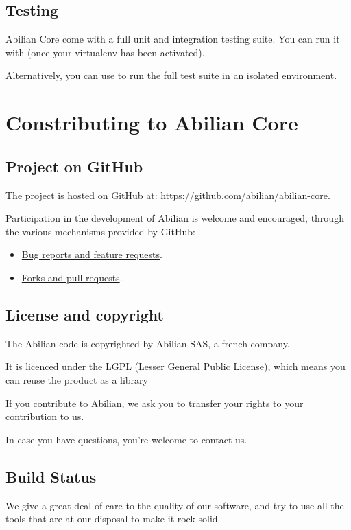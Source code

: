 \documentclass[a4paper,12pt,english]{sphinxmanual}
\begin{document}
\section{Testing}
\label{installing:testing}
Abilian Core come with a full unit and integration testing suite. You
can run it with  (once your virtualenv has been activated).

Alternatively, you can use  to run the full test suite in an
isolated environment.


\chapter{Constributing to Abilian Core}
\label{contributing:constributing-to-abilian-core}\label{contributing::doc}

\section{Project on GitHub}
\label{contributing:project-on-github}
The project is hosted on GitHub at: \href{https://github.com/abilian/abilian-core}{https://github.com/abilian/abilian-core}.

Participation in the development of Abilian is welcome and encouraged, through
the various mechanisms provided by GitHub:
\begin{itemize}
\item {} 
\href{https://github.com/abilian/abilian-core/issues}{Bug reports and feature requests}.

\item {} 
\href{https://github.com/abilian/abilian-core/pulls}{Forks and pull requests}.

\end{itemize}


\section{License and copyright}
\label{contributing:license-and-copyright}
The Abilian code is copyrighted by Abilian SAS, a french company.

It is licenced under the LGPL (Lesser General Public License), which means
you can reuse the product as a library

If you contribute to Abilian, we ask you to transfer your rights to your
contribution to us.

In case you have questions, you're welcome to contact us.


\section{Build Status}
\label{contributing:build-status}
We give a great deal of care to the quality of our software, and try to use
all the tools that are at our disposal to make it rock-solid.
\end{document}
